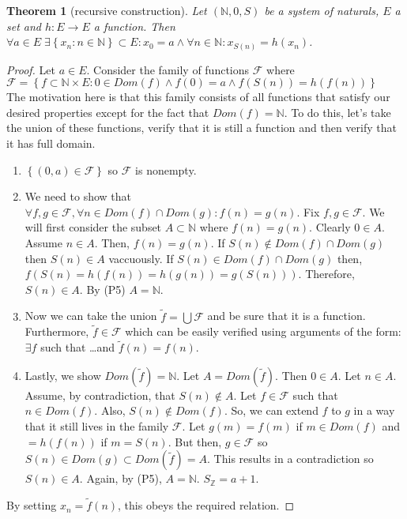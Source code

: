 \documentclass{article}
\newcommand\N{\ensuremath{\mathbb{N}}}
\newcommand\Z{\ensuremath{\mathbb{Z}}}
\newtheorem{theorem}{Theorem}[section]
\theoremstyle{definition}
\theoremstyle{remark}
\theoremstyle{plain}
\begin{document}
\begin{theorem}[recursive construction]
    Let \((\N, 0, S)\) be a system of naturals, \(E\) a set and \(h: E \to E\)
    a function. Then \(\forall a \in E \; \exists \left\{ x_n: n \in \N \right\} \subset E: x_0 = a \land \forall n \in \N: x_{S(n)} = h(x_n)\).
\end{theorem}

\begin{proof}
    Let \(a \in E\). Consider the family of functions \(\mathcal{F}\) where \\
    \(\mathcal{F} = \left\{ f \subset \N\times E : 0\in Dom(f) \land f(0) = a \land f(S(n)) = h(f(n)) \right\}\)\\
    The motivation here is that this family consists of all functions that satisfy our desired properties except 
    for the fact that \(Dom(f) = \N\). To do this, let's take the union of these functions, verify that it is still a function and 
    then verify that it has full domain. 
    \begin{enumerate}
        \item \(\left\{ (0,a) \in \mathcal{F} \right\}\) so \(\mathcal{F}\) is nonempty.
        \item We need to show that \(\forall f,g \in \mathcal{F}, \forall n \in Dom(f)\cap Dom(g): f(n) = g(n)\). 
        Fix \(f,g \in \mathcal{F}\). We will first consider the subset \(A \subset \N\) where \(f(n) = g(n)\). Clearly \(0 \in A\). 
        Assume \(n \in A\). Then, \(f(n) = g(n)\). If \(S(n) \notin Dom(f)\cap Dom(g)\) then \(S(n) \in A\) vaccuously. 
        If \(S(n) \in Dom(f)\cap Dom(g)\) then, \(f(S(n) = h(f(n)) = h(g(n))= g(S(n)))\). Therefore, \(S(n) \in A\). By (P5) \(A = \N\).
        \item Now we can take the union \(\tilde{f} = \bigcup\mathcal{F}\) and be sure that it is a function. Furthermore, 
        \(\tilde{f} \in \mathcal{F}\) which can be easily verified using arguments of the form: \(\exists f\) such that \ldots and \(\tilde{f}(n) = f(n)\).
        \item Lastly, we show \(Dom(\tilde{f}) = \N\). Let \(A = Dom(\tilde{f})\). Then \(0 \in A\). Let \(n \in A\). Assume, by contradiction, that 
        \(S(n) \notin A\). Let \(f \in \mathcal{F}\) such that \(n \in Dom(f)\). Also, \(S(n) \notin Dom(f)\). So, we can extend \(f\) to \(g\) in a way that it still lives
        in the family \(\mathcal{F}\). Let \(g(m) = f(m)\) if \(m \in Dom(f)\) and \( = h(f(n))\) if \(m = S(n)\). But then, \(g \in \mathcal{F}\) so \(S(n) \in Dom(g) \subset
        Dom(\tilde{f}) = A\). This results in a contradiction so \(S(n) \in A\). Again, by (P5), \(A = \N\). \(S_{\Z} = a + 1\). 
    \end{enumerate}

    By setting \(x_n = \tilde{f}(n)\), this obeys the required relation.
\end{proof}
\end{document}
